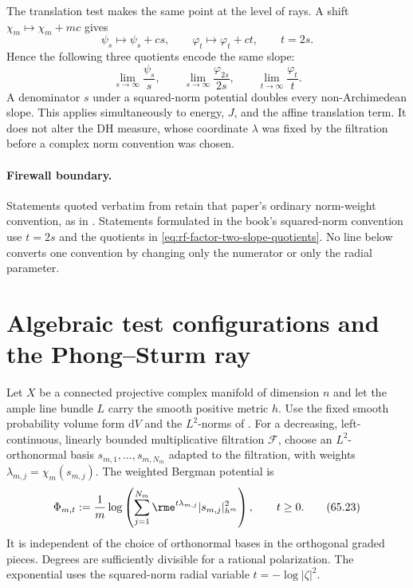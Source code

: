 The translation test makes the same point at the level of rays.  A shift
$\chi_m\mapsto\chi_m+mc$ gives
\[
       \psi_s\longmapsto\psi_s+cs,
       \qquad
       \varphi_t\longmapsto\varphi_t+ct,
       \qquad t=2s.
\tag{65.21}\label{eq:rf-factor-two-translation}
\]
Hence the following three quotients encode the same slope:
\[
 \lim_{s\to\infty}\frac{\psi_s}{s},
 \qquad
 \lim_{s\to\infty}\frac{\varphi_{2s}}{2s},
 \qquad
 \lim_{t\to\infty}\frac{\varphi_t}{t}.
\tag{65.22}\label{eq:rf-factor-two-slope-quotients}
\]
A denominator $s$ under a squared-norm potential doubles every
non-Archimedean slope.  This applies simultaneously to energy, $J$, and
the affine translation term.  It does not alter the DH measure, whose
coordinate $\lambda$ was fixed by the filtration before a complex norm
convention was chosen.

\paragraph{Firewall boundary.}
Statements quoted verbatim from \cite{BHJ19} retain that paper's ordinary
norm-weight convention, as in
.  Statements formulated in the book's
squared-norm convention use $t=2s$ and the quotients in
\eqref{eq:rf-factor-two-slope-quotients}.  No line below converts one
convention by changing only the numerator or only the radial parameter.

\section{Algebraic test configurations and the Phong--Sturm ray}
\label{sec:rf-phong-sturm}

Let $X$ be a connected projective complex manifold of dimension $n$ and let the ample line bundle $L$ carry the smooth positive metric $h$. Use the fixed smooth probability volume form $\mathrm dV$ and the $L^2$-norms of . For a decreasing, left-continuous, linearly bounded multiplicative filtration $\mathcal F$, choose an $L^2$-orthonormal basis $s_{m,1},\ldots,s_{m,N_m}$ adapted to the filtration, with weights $\lambda_{m,j}=\chi_m(s_{m,j})$. The weighted Bergman potential is
\[
 \Phi_{m,t}:=\frac1m\log\left(
       \sum_{j=1}^{N_m}\rme^{t\lambda_{m,j}}
                    |s_{m,j}|_{h^m}^2\right),\qquad t\geq0.
\tag{65.23}\label{eq:rf-bergman-ray}
\]
It is independent of the choice of orthonormal bases in the orthogonal graded pieces. Degrees are sufficiently divisible for a rational polarization. The exponential uses the squared-norm radial variable $t=-\log|\zeta|^2$.

